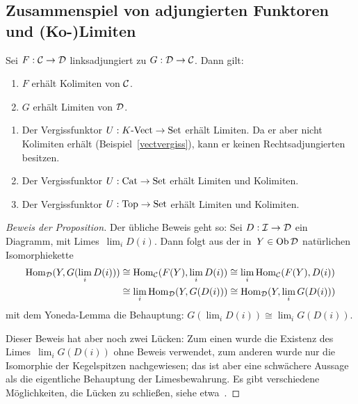

\subsection{Zusammenspiel von adjungierten Funktoren und (Ko-)Limiten}

\begin{prop}\label{limitenbeiadjunktionen}%
Sei $F:\mathcal{C}\to\mathcal{D}$ linksadjungiert zu $G:\mathcal{D}\to\mathcal{C}$. Dann gilt:
\begin{enumerate}
\item $F$ erhält Kolimiten von $\mathcal{C}$.
\item $G$ erhält Limiten von $\mathcal{D}$.
\end{enumerate}
\end{prop}

\begin{bsp}\label{vergissstetig}
\begin{enumerate}
\item Der Vergissfunktor $U:{K\text{-}\mathrm{Vect}} \to \mathrm{Set}$ erhält Limiten.
Da er aber nicht Kolimiten erhält (Beispiel~\ref{vectvergiss}), kann er keinen
Rechtsadjungierten besitzen.
\item \label{vergisscat}Der Vergissfunktor $U:\mathrm{Cat} \to \mathrm{Set}$ erhält Limiten und Kolimiten.
\item Der Vergissfunktor $U:\mathrm{Top} \to \mathrm{Set}$ erhält Limiten und Kolimiten.
\end{enumerate}
\end{bsp}

\begin{proof}[Beweis der Proposition]
Der übliche Beweis geht so: Sei $D:\mathcal{I}\to\mathcal{D}$ ein Diagramm, mit Limes~$\lim_i D(i)$.
Dann folgt aus der in~$Y \in \operatorname{Ob}\mathcal{D}$ natürlichen Isomorphiekette
\begin{align*}
  \mathrm{Hom}_{\mathcal{D}}(Y,G(\lim_i D(i))) &\cong
  \mathrm{Hom}_{\mathcal{C}}(F(Y),\lim_i D(i)) \cong
  \lim_i \mathrm{Hom}_{\mathcal{C}}(F(Y), D(i)) \\
  & \cong
  \lim_i \mathrm{Hom}_{\mathcal{D}}(Y, G(D(i))) \cong
  \mathrm{Hom}_{\mathcal{D}}(Y, \lim_i G(D(i)))
\end{align*}
mit dem Yoneda-Lemma die Behauptung: $G(\lim_i D(i)) \cong \lim_i G(D(i))$.

Dieser Beweis hat aber noch zwei Lücken: Zum einen wurde die Existenz des
Limes~$\lim_i G(D(i))$ ohne Beweis verwendet, zum anderen wurde nur die
Isomorphie der Kegelspitzen nachgewiesen; das ist aber eine schwächere Aussage
als die eigentliche Behauptung der Limesbewahrung. Es gibt verschiedene
Möglichkeiten, die Lücken zu schließen, siehe etwa~\cite{gaillard,lin}.
\end{proof}


